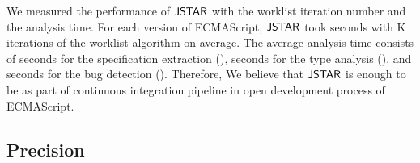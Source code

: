 We measured the performance of $\tool$ with the worklist iteration number
and the analysis time.  For each version of ECMAScript,
$\tool$ took  seconds with K iterations of
the worklist algorithm on average.  The average analysis time consists of  seconds
for the specification extraction (),
 seconds for the type analysis (), and
 seconds for the bug detection ().
Therefore, We believe that $\tool$ is enough to be as part of continuous
integration pipeline in open development process of ECMAScript.


\subsection{Precision}\label{sec:precision}

% 
% 
% 

